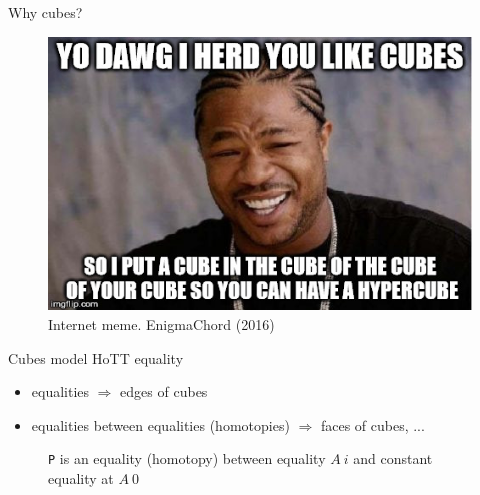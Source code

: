 \documentclass[english,draft]{beamer}
\begin{document}
\begin{frame}{Why cubes?}

\begin{figure}[h!]
    \includegraphics[width=.8\textwidth]{figures/cube-joke.jpg}
    \caption{Internet meme. EnigmaChord (2016)}
\end{figure}
\end{frame}


\begin{frame}{Cubes model HoTT equality}
 
\begin{itemize}
 \item equalities $\Rightarrow$ edges of cubes
 \item equalities between equalities (homotopies) $\Rightarrow$ faces of cubes, ...
\end{itemize}

\begin{figure}
 
 \caption{ \texttt{P} is an equality (homotopy) between equality $A\ i$ and constant equality at $A \ 0$}
\end{figure}
\end{frame}
\end{document}
